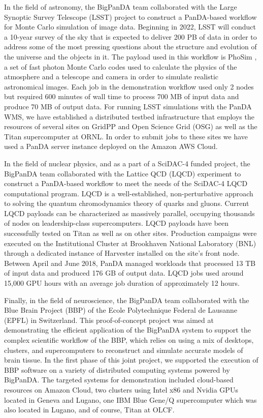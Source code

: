 In the field of astronomy, the BigPanDA team collaborated with the Large
Synoptic Survey Telescope (LSST) project to construct a PanDA-based workflow
for Monte Carlo simulation of image data. Beginning in 2022, LSST will conduct
a 10-year survey of the sky that is expected to deliver 200 PB of data in order
to address some of the most pressing questions about the structure and
evolution of the universe and the objects in it. The payload used in this
workflow is PhoSim \cite{}, a set of fast photon Monte Carlo codes used to
calculate the physics of the atmosphere and a telescope and camera in order to
simulate realistic astronomical images. Each job in the demonstration workflow
used only 2 nodes but required 600 minutes of wall time to process 700 MB of
input data and produce 70 MB of output data. For running LSST simulations with
the PanDA WMS, we have established a distributed testbed infrastructure that
employs the resources of several sites on GridPP \cite{0954-3899-32-1-N01} and
Open Science Grid (OSG) \cite{1742-6596-78-1-012057} as well as the Titan
supercomputer at ORNL. In order to submit jobs to these sites we have used a
PanDA server instance deployed on the Amazon AWS Cloud.

In the field of nuclear physics, and as a part of a SciDAC-4 funded project,
the BigPanDA team collaborated with the Lattice QCD (LQCD)
\cite{Babich:2010:PQL:1884643.1884695} experiment to construct a PanDA-based
workflow to meet the needs of the SciDAC-4 LQCD computational program. LQCD is
a well-established, non-perturbative approach to solving the quantum
chromodynamics theory of quarks and gluons. Current LQCD payloads can be
characterized as massively parallel, occupying thousands of nodes on
leadership-class supercomputers. LQCD payloads have been successfully tested on
Titan as well as on other sites. Production campaigns were executed on the
Institutional Cluster at Brookhaven National Laboratory (BNL) through a
dedicated instance of Harvester \cite{} installed on the site's front node.
Between April and June 2018, PanDA managed workloads that processed 13 TB of
input data and produced 176 GB of output data. LQCD jobs used around 15,000 GPU
hours with an average job duration of approximately 12 hours.

Finally, in the field of neuroscience, the BigPanDA team collaborated with the
Blue Brain Project (BBP) \cite{Markram} of the Ecole Polytechnique Federal de
Lausanne (EPFL) in Switzerland. This proof-of-concept project was aimed at
demonstrating the efficient application of the BigPanDA system to support the
complex scientific workflow of the BBP, which relies on using a mix of
desktops, clusters, and supercomputers to reconstruct and simulate accurate
models of brain tissue. In the first phase of this joint project, we supported
the execution of BBP software on a variety of distributed computing systems
powered by BigPanDA. The targeted systems for demonstration included
cloud-based resources on Amazon Cloud, two clusters using Intel x86 and Nvidia
GPUs located in Geneva and Lugano, one IBM Blue Gene/Q \cite{citeulike:472727}
supercomputer which was also located in Lugano, and of course, Titan at OLCF.


